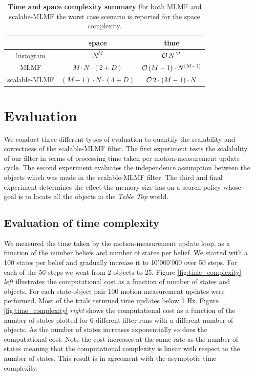 \begin{table}
 \centering
 \begin{tabular}{c|c|c|}
	         &    space   &     time \\ \hline
   histogram     &    $N^M$                                         &  $\operatorname{\mathcal{O}}{N^M}$ \\ \hline
   MLMF          &    $M \cdot N \cdot \left(2 + D\right)$          &  $\operatorname{\mathcal{O}}{(M-1) \cdot N^{(M-1)}}$ \\ \hline
   scalable-MLMF &    $(M - 1) \cdot N \cdot \left(4 + D\right)$    &  $\operatorname{\mathcal{O}}{2 \cdot (M-1) \cdot N}$ \\ \hline
   \end{tabular}
   \caption{\textbf{Time and space complexity summary} For both MLMF and scalabe-MLMF the worst case scenario is reported for the space complexity.}
   \label{tab:time_space_summary}
\end{table}




\section{Evaluation}\label{ch5:evaluation}

We conduct three different types of evaluation to quantify the scalability and correctness of the scalable-MLMF filter. The first experiment
tests the scalability of our filter in terms of processing time taken per motion-measurement update cycle. The second experiment evaluates the independence 
assumption between the objects which was made in the scalable-MLMF filter. The third and final experiment determines the effect the memory size has 
on a search policy whose goal is to locate all the objects in the \textit{Table Top} world.

\subsection{Evaluation of time complexity}

We measured the time taken by the motion-measurement update loop, as a function of the number beliefs and number of states per belief. 
We started with a 100 states per belief and gradually increase it to 10'000'000 over 50 steps. For each of the 50 steps we went from 2 objects to 25. Figure \ref{fig:time_complexity} \textit{left} illustrates the computational
cost as a function of number of states and objects. For each state-object pair 100 motion-measurement updates were performed. Most of the trials returned time updates 
below 1 Hz. Figure \ref{fig:time_complexity} \textit{right} shows the computational cost as a function of the number of states plotted for 6 different filter runs with
a different number of objects. As the number of states increases exponentially so does the computational cost. Note the cost increases at the same
rate as the number of states meaning that the computational complexity is linear with respect to the number of states. This result is in agreement with 
the asymptotic time complexity.

